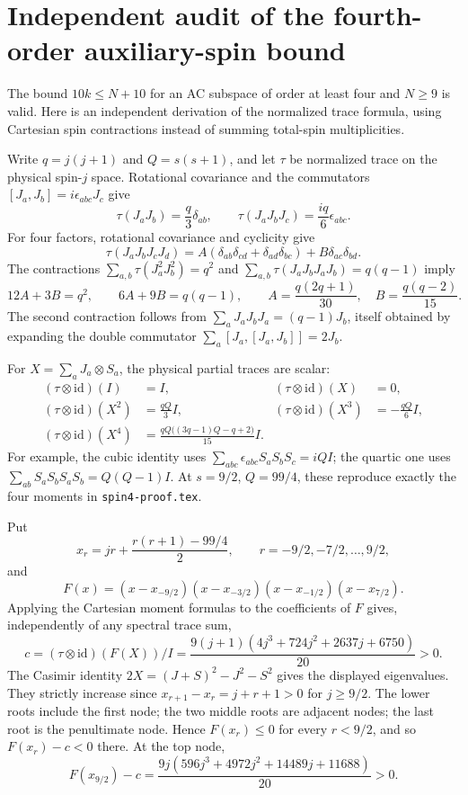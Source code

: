 \documentclass{article}
\begin{document}
\section*{Independent audit of the fourth-order auxiliary-spin bound}
The bound $10k\le N+10$ for an AC subspace of order at least four and
$N\ge9$ is valid.  Here is an independent derivation of the normalized
trace formula, using Cartesian spin contractions instead of summing
total-spin multiplicities.

Write $q=j(j+1)$ and $Q=s(s+1)$, and let $\tau$ be normalized trace on
the physical spin-$j$ space.  Rotational covariance and the commutators
$[J_a,J_b]=i\epsilon_{abc}J_c$ give
\[
 \tau(J_aJ_b)=\frac q3\delta_{ab},\qquad
 \tau(J_aJ_bJ_c)=\frac{iq}{6}\epsilon_{abc}.
\]
For four factors, rotational covariance and cyclicity give
\[
 \tau(J_aJ_bJ_cJ_d)=
 A(\delta_{ab}\delta_{cd}+\delta_{ad}\delta_{bc})+
 B\delta_{ac}\delta_{bd}.
\]
The contractions $\sum_{a,b}\tau(J_a^2J_b^2)=q^2$ and
$\sum_{a,b}\tau(J_aJ_bJ_aJ_b)=q(q-1)$ imply
\[
 12A+3B=q^2,\qquad6A+9B=q(q-1),
 \qquad
 A=\frac{q(2q+1)}{30},\quad B=\frac{q(q-2)}{15}.
\]
The second contraction follows from
$\sum_aJ_aJ_bJ_a=(q-1)J_b$, itself obtained by expanding the double
commutator $\sum_a[J_a,[J_a,J_b]]=2J_b$.

For $X=\sum_a J_a\otimes S_a$, the physical partial traces are scalar:
\begin{align*}
 (\tau\otimes\mathrm{id})(I)&=I,&
 (\tau\otimes\mathrm{id})(X)&=0,\\
 (\tau\otimes\mathrm{id})(X^2)&=\frac{qQ}{3}I,&
 (\tau\otimes\mathrm{id})(X^3)&=-\frac{qQ}{6}I,\\
 (\tau\otimes\mathrm{id})(X^4)&=
 \frac{qQ\bigl((3q-1)Q-q+2\bigr)}{15}I.
\end{align*}
For example, the cubic identity uses
$\sum_{abc}\epsilon_{abc}S_aS_bS_c=iQI$; the quartic one uses
$\sum_{ab}S_aS_bS_aS_b=Q(Q-1)I$.
At $s=9/2$, $Q=99/4$, these reproduce exactly the four moments in
\texttt{spin4-proof.tex}.

Put
\[
 x_r=jr+\frac{r(r+1)-99/4}{2},
 \qquad r=-9/2,-7/2,\ldots,9/2,
\]
and
\[
 F(x)=(x-x_{-9/2})(x-x_{-3/2})(x-x_{-1/2})(x-x_{7/2}).
\]
Applying the Cartesian moment formulas to the coefficients of $F$
gives, independently of any spectral trace sum,
\[
 c=(\tau\otimes\mathrm{id})(F(X))/I
 =\frac{9(j+1)(4j^3+724j^2+2637j+6750)}{20}>0.
\]
The Casimir identity $2X=(J+S)^2-J^2-S^2$ gives the displayed
eigenvalues.  They strictly increase since
$x_{r+1}-x_r=j+r+1>0$ for $j\ge9/2$.
The lower roots include the first node; the two middle roots are
adjacent nodes; the last root is the penultimate node.  Hence
$F(x_r)\le0$ for every $r<9/2$, and so $F(x_r)-c<0$ there.
At the top node,
\[
 F(x_{9/2})-c=
 \frac{9j(596j^3+4972j^2+14489j+11688)}{20}>0.
\]
\end{document}
